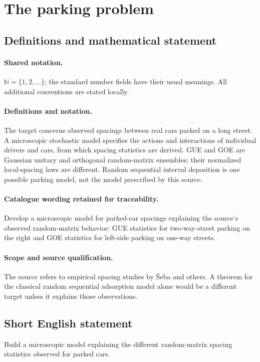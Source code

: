\documentclass[11pt]{article}
\begin{document}
\section{The parking problem}\label{statement}

\subsection{Definitions and mathematical statement}

\paragraph{Shared notation.}$\mathbb N=\{1,2,\ldots\}$; the standard number fields have their usual meanings. All additional conventions are stated locally.


\paragraph{Definitions and notation.}The target concerns observed spacings between real cars parked on a long street. A microscopic stochastic model specifies the actions and interactions of individual drivers and cars, from which spacing statistics are derived. GUE and GOE are Gaussian unitary and orthogonal random-matrix ensembles; their normalized local-spacing laws are different. Random sequential interval deposition is one possible parking model, not the model prescribed by this source.

\paragraph{Catalogue wording retained for traceability.}
Develop a microscopic model for parked-car spacings explaining the source’s observed random-matrix behavior: GUE statistics for two-way-street parking on the right and GOE statistics for left-side parking on one-way streets.
\paragraph{Scope and source qualification.}The source refers to empirical spacing studies by Šeba and others. A theorem for the classical random sequential adsorption model alone would be a different target unless it explains those observations.
\subsection{Short English statement}
Build a microscopic model explaining the different random-matrix spacing statistics observed for parked cars.
\end{document}
